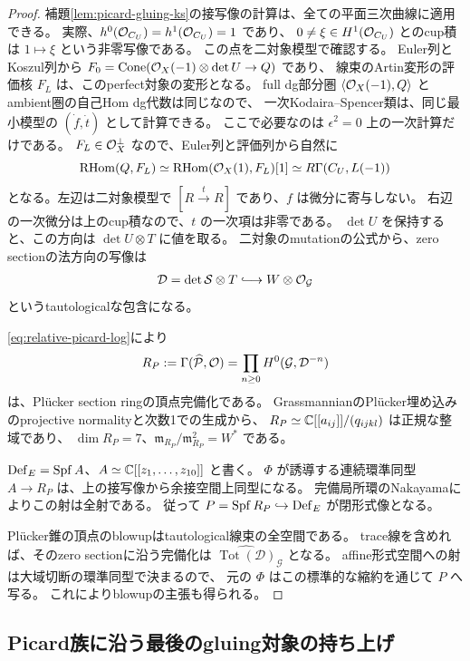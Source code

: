 \begin{proof}
補題\ref{lem:picard-gluing-ks}の接写像の計算は、全ての平面三次曲線に適用できる。
実際、$h^0(\mathcal O_{C_U})=h^1(\mathcal O_{C_U})=1$ であり、
$0\ne\xi\in H^1(\mathcal O_{C_U})$ とのcup積は $1\mapsto\xi$ という非零写像である。
この点を二対象模型で確認する。
Euler列とKoszul列から
$F_0=\operatorname{Cone}(\mathcal O_X(-1)\otimes\det U\to Q)$ であり、
線束のArtin変形の評価核 $F_L$ は、このperfect対象の変形となる。
full dg部分圏 $\langle\mathcal O_X(-1),Q\rangle$ とambient圏の自己Hom dg代数は同じなので、
一次Kodaira--Spencer類は、同じ最小模型の $(\dot f,\dot t)$ として計算できる。
ここで必要なのは $\epsilon^2=0$ 上の一次計算だけである。
$F_L\in\mathcal O_X^\perp$ なので、Euler列と評価列から自然に
\[
 \operatorname{RHom}(Q,F_L)
  \simeq\operatorname{RHom}(\mathcal O_X(1),F_L)[1]
  \simeq R\Gamma(C_U,L(-1))
\]
となる。左辺は二対象模型で $[R\xrightarrow{t}R]$ であり、$f$ は微分に寄与しない。
右辺の一次微分は上のcup積なので、$t$ の一次項は非零である。
$\det U$ を保持すると、この方向は $\det U\otimes T$ に値を取る。
二対象のmutationの公式から、zero sectionの法方向の写像は
\[
 \mathcal D=\det\mathcal S\otimes T
    \lhook\joinrel\longrightarrow W\otimes\OO_{\mathcal G}
\]
というtautologicalな包含になる。

\eqref{eq:relative-picard-log}により
\[
 R_P:=\Gamma(\widehat{\mathcal P},\mathcal O)
   =\prod_{n\ge0}H^0(\mathcal G,\mathcal D^{-n})
\]
は、Pl\"ucker section ringの頂点完備化である。
GrassmannianのPl\"ucker埋め込みのprojective normalityと次数1での生成から、
$R_P\simeq\mathbb C[[a_{ij}]]/(q_{ijkl})$ は正規な整域であり、
$\dim R_P=7$、$\mathfrak m_{R_P}/\mathfrak m_{R_P}^2=W^*$ である。

$\operatorname{Def}_E=\operatorname{Spf} A$、$A\simeq\mathbb C[[z_1,\ldots,z_{10}]]$ と書く。
$\Phi$ が誘導する連続環準同型 $A\to R_P$ は、上の接写像から余接空間上同型になる。
完備局所環のNakayamaによりこの射は全射である。
従って $P=\operatorname{Spf} R_P\hookrightarrow\operatorname{Def}_E$ が閉形式像となる。

Pl\"ucker錐の頂点のblowupはtautological線束の全空間である。
trace線を含めれば、そのzero sectionに沿う完備化は
$\widehat{\operatorname{Tot}(\mathcal D)}_{\mathcal G}$ となる。
affine形式空間への射は大域切断の環準同型で決まるので、
元の $\Phi$ はこの標準的な縮約を通じて $P$ へ写る。
これによりblowupの主張も得られる。
\end{proof}

\subsection{Picard族に沿う最後のgluing対象の持ち上げ}

